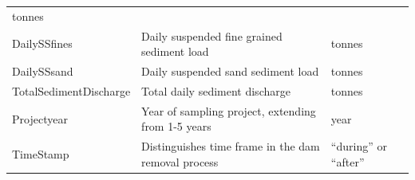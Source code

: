 \documentclass[12pt,]{article}
\begin{document}
\begin{longtable}[]{@{}lll@{}}
\begin{minipage}[t]{0.16\columnwidth}
tonnes\strut
\end{minipage}\tabularnewline
\begin{minipage}[t]{0.30\columnwidth}\raggedright
DailySSfines\strut
\end{minipage} & \begin{minipage}[t]{0.46\columnwidth}\raggedright
Daily suspended fine grained sediment load\strut
\end{minipage} & \begin{minipage}[t]{0.16\columnwidth}\raggedright
tonnes\strut
\end{minipage}\tabularnewline
\begin{minipage}[t]{0.30\columnwidth}\raggedright
DailySSsand\strut
\end{minipage} & \begin{minipage}[t]{0.46\columnwidth}\raggedright
Daily suspended sand sediment load\strut
\end{minipage} & \begin{minipage}[t]{0.16\columnwidth}\raggedright
tonnes\strut
\end{minipage}\tabularnewline
\begin{minipage}[t]{0.30\columnwidth}\raggedright
TotalSedimentDischarge\strut
\end{minipage} & \begin{minipage}[t]{0.46\columnwidth}\raggedright
Total daily sediment discharge\strut
\end{minipage} & \begin{minipage}[t]{0.16\columnwidth}\raggedright
tonnes\strut
\end{minipage}\tabularnewline
\begin{minipage}[t]{0.30\columnwidth}\raggedright
Projectyear\strut
\end{minipage} & \begin{minipage}[t]{0.46\columnwidth}\raggedright
Year of sampling project, extending from 1-5 years\strut
\end{minipage} & \begin{minipage}[t]{0.16\columnwidth}\raggedright
year\strut
\end{minipage}\tabularnewline
\begin{minipage}[t]{0.30\columnwidth}\raggedright
TimeStamp\strut
\end{minipage} & \begin{minipage}[t]{0.46\columnwidth}\raggedright
Distinguishes time frame in the dam removal process\strut
\end{minipage} & \begin{minipage}[t]{0.16\columnwidth}\raggedright
``during'' or ``after''\strut
\end{minipage}\tabularnewline
\bottomrule
\end{longtable}
\end{document}
